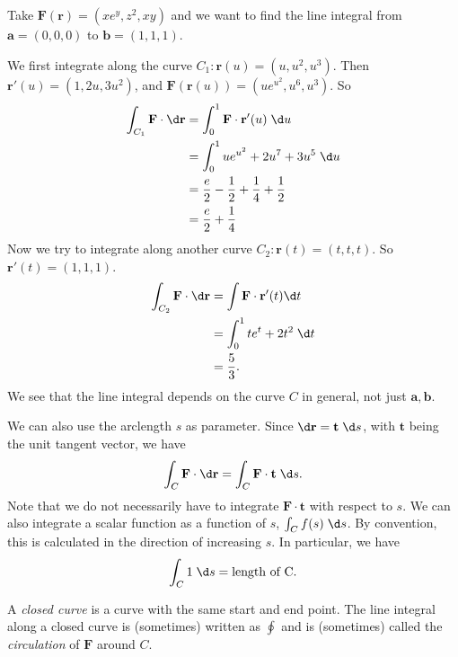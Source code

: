 \documentclass[a4paper]{article}
\begin{document}
\begin{eg}
  Take $\mathbf{F}(\mathbf{r}) = (xe^y, z^2, xy)$ and we want to find the line integral from $\mathbf{a}=(0, 0, 0)$ to $\mathbf{b}=(1, 1, 1)$.
  \begin{center}
  \end{center}
  We first integrate along the curve $C_1: \mathbf{r}(u) = (u, u^2, u^3)$. Then $\mathbf{r}'(u) = (1, 2u, 3u^2)$, and $\mathbf{F}(\mathbf{r}(u)) = (ue^{u^2}, u^6, u^3)$. So
  \begin{align*}
    \int_{C_1} \mathbf{F}\cdot \d\mathbf{r} &= \int_0^1 \mathbf{F}\cdot\mathbf{r}'(u)\; \d u\\
    &= \int_0^1 ue^{u^2} + 2u^7 + 3u^5\;\d u\\
    &= \frac{e}{2} -\frac{1}{2} + \frac{1}{4} + \frac{1}{2}\\
    &= \frac{e}{2} + \frac{1}{4}
  \end{align*}
  Now we try to integrate along another curve $C_2: \mathbf{r}(t) = (t, t, t)$. So $\mathbf{r}'(t) = (1,1, 1)$.
  \begin{align*}
    \int_{C_2} \mathbf{F}\cdot \d \mathbf{r} &= \int \mathbf{F}\cdot \mathbf{r}'(t)\d t\\
    &= \int_0^1 te^t + 2t^2\; \d t\\
    &= \frac{5}{3}.
  \end{align*}
  We see that the line integral depends on the curve $C$ in general, not just $\mathbf{a}, \mathbf{b}$.
\end{eg}

We can also use the arclength $s$ as parameter. Since $\d \mathbf{r} = \mathbf{t}\;\d s$, with $\mathbf{t}$ being the unit tangent vector, we have
\[
  \int_C \mathbf{F}\cdot \d \mathbf{r} = \int_C \mathbf{F}\cdot \mathbf{t}\;\d s.
\]
Note that we do not necessarily have to integrate $\mathbf{F}\cdot \mathbf{t}$ with respect to $s$. We can also integrate a scalar function as a function of $s$, $\int_C f(s)\;\d s$. By convention, this is calculated in the direction of increasing $s$. In particular, we have
\[
  \int_C 1\;\d s = \text{length of C}.
\]
\begin{defi}
  A \emph{closed curve} is a curve with the same start and end point. The line integral along a closed curve is (sometimes) written as $\oint$ and is (sometimes) called the \emph{circulation} of $\mathbf{F}$ around $C$.
\end{defi}
\end{document}
